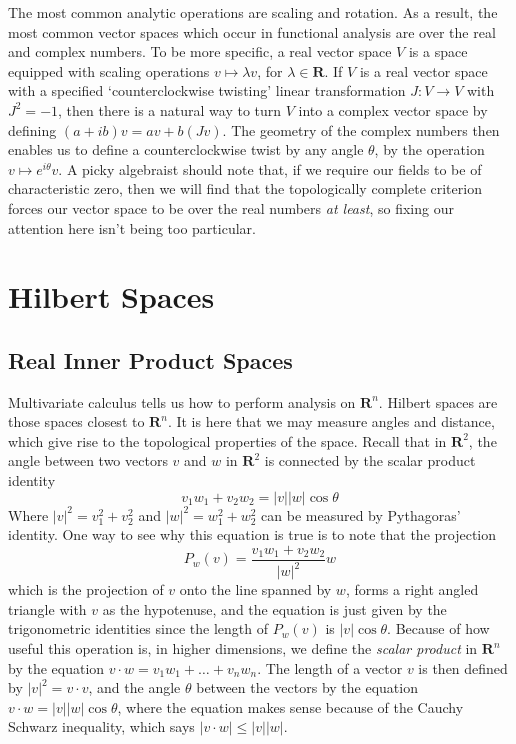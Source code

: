 The most common analytic operations are scaling and rotation. As a result, the most common vector spaces which occur in functional analysis are over the real and complex numbers. To be more specific, a real vector space $V$ is a space equipped with scaling operations $v \mapsto \lambda v$, for $\lambda \in \mathbf{R}$. If $V$ is a real vector space with a specified `counterclockwise twisting' linear transformation $J: V \to V$ with $J^2 = -1$, then there is a natural way to turn $V$ into a complex vector space by defining $(a + ib)v = av + b(Jv)$. The geometry of the complex numbers then enables us to define a counterclockwise twist by any angle $\theta$, by the operation $v \mapsto e^{i\theta} v$. A picky algebraist should note that, if we require our fields to be of characteristic zero, then we will find that the topologically complete criterion forces our vector space to be over the real numbers {\it at least}, so fixing our attention here isn't being too particular.

\chapter{Hilbert Spaces}

\section{Real Inner Product Spaces}

Multivariate calculus tells us how to perform analysis on $\mathbf{R}^n$. Hilbert spaces are those spaces closest to $\mathbf{R}^n$. It is here that we may measure angles and distance, which give rise to the topological properties of the space. Recall that in $\mathbf{R}^2$, the angle between two vectors $v$ and $w$ in $\mathbf{R}^2$ is connected by the scalar product identity
%
\[ v_1w_1 + v_2w_2 = |v||w| \cos \theta \]
%
Where $|v|^2 = v_1^2 + v_2^2$ and $|w|^2 = w_1^2 + w_2^2$ can be measured by Pythagoras' identity. One way to see why this equation is true is to note that the projection
%
\[ P_w(v) = \frac{v_1w_1 + v_2w_2}{|w|^2} w \]
%
which is the projection of $v$ onto the line spanned by $w$, forms a right angled triangle with $v$ as the hypotenuse, and the equation is just given by the trigonometric identities since the length of $P_w(v)$ is $|v| \cos \theta$. Because of how useful this operation is, in higher dimensions, we define the {\it scalar product} in $\mathbf{R}^n$ by the equation $v \cdot w = v_1w_1 + \dots + v_nw_n$. The length of a vector $v$ is then defined by $|v|^2 = v \cdot v$, and the angle $\theta$ between the vectors by the equation $v \cdot w = |v| |w| \cos \theta$, where the equation makes sense because of the Cauchy Schwarz inequality, which says $|v \cdot w| \leq |v||w|$.

